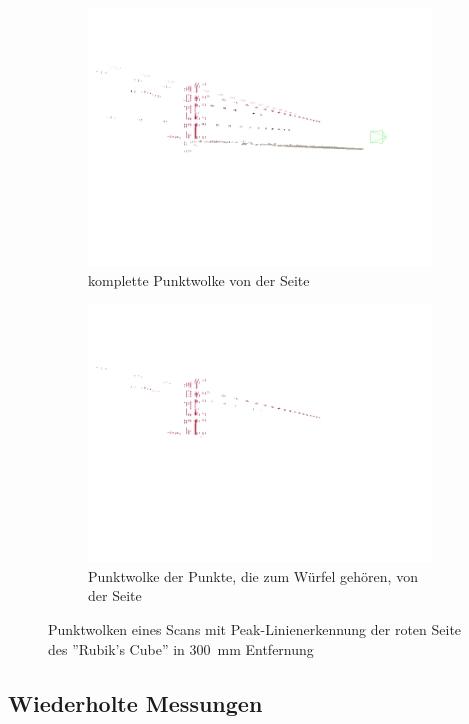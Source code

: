 \documentclass[ngerman,a4paper,parskip=half]{scrartcl}
\begin{document}
\begin{figure}[H]
\begin{subfigure}{0.45\textwidth}
		\includegraphics[width=\textwidth]{includes/peak_red_pos1.png}
		\caption{komplette Punktwolke von der Seite}
	\end{subfigure}
	\hfill
	\begin{subfigure}{0.45\textwidth}
		\includegraphics[width=\textwidth]{includes/peak_only_red_pos1.png}
		\caption{Punktwolke der Punkte, die zum Würfel gehören, von der Seite}
	\end{subfigure}
	\caption{Punktwolken eines Scans mit Peak-Linienerkennung der roten Seite des ''Rubik's Cube'' in 300~mm Entfernung}
\end{figure}


\subsection{Wiederholte Messungen}
\label{sec:reps}
\end{document}
